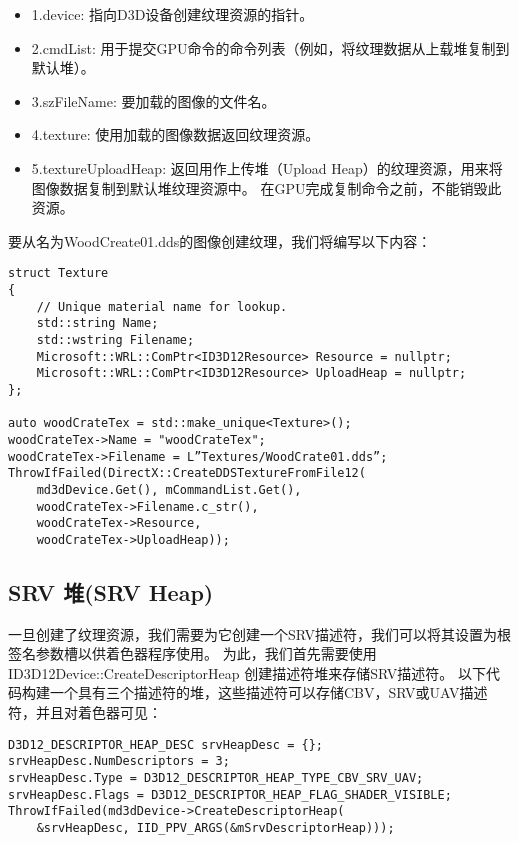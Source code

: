 \begin{itemize}
  \item 1.device: 指向D3D设备创建纹理资源的指针。
  \item 2.cmdList: 用于提交GPU命令的命令列表（例如，将纹理数据从上载堆复制到默认堆）。
  \item 3.szFileName: 要加载的图像的文件名。
  \item 4.texture: 使用加载的图像数据返回纹理资源。
  \item 5.textureUploadHeap: 返回用作上传堆（Upload Heap）的纹理资源，用来将图像数据复制到默认堆纹理资源中。 在GPU完成复制命令之前，不能销毁此资源。
\end{itemize}

\begin{flushleft}
要从名为WoodCreate01.dds的图像创建纹理，我们将编写以下内容：\\
\end{flushleft}

\begin{lstlisting}
struct Texture
{
    // Unique material name for lookup.
    std::string Name;
    std::wstring Filename;
    Microsoft::WRL::ComPtr<ID3D12Resource> Resource = nullptr;
    Microsoft::WRL::ComPtr<ID3D12Resource> UploadHeap = nullptr;
};

auto woodCrateTex = std::make_unique<Texture>();
woodCrateTex->Name = "woodCrateTex";
woodCrateTex->Filename = L”Textures/WoodCrate01.dds”;
ThrowIfFailed(DirectX::CreateDDSTextureFromFile12(
    md3dDevice.Get(), mCommandList.Get(),
    woodCrateTex->Filename.c_str(),
    woodCrateTex->Resource, 
    woodCrateTex->UploadHeap));
\end{lstlisting}

\subsection{SRV 堆(SRV Heap)}
\begin{flushleft}
一旦创建了纹理资源，我们需要为它创建一个SRV描述符，我们可以将其设置为根签名参数槽以供着色器程序使用。 为此，我们首先需要使用 ID3D12Device::CreateDescriptorHeap 创建描述符堆来存储SRV描述符。 以下代码构建一个具有三个描述符的堆，这些描述符可以存储CBV，SRV或UAV描述符，并且对着色器可见：\\
\end{flushleft}

\begin{lstlisting}
D3D12_DESCRIPTOR_HEAP_DESC srvHeapDesc = {};
srvHeapDesc.NumDescriptors = 3;
srvHeapDesc.Type = D3D12_DESCRIPTOR_HEAP_TYPE_CBV_SRV_UAV;
srvHeapDesc.Flags = D3D12_DESCRIPTOR_HEAP_FLAG_SHADER_VISIBLE;
ThrowIfFailed(md3dDevice->CreateDescriptorHeap(
    &srvHeapDesc, IID_PPV_ARGS(&mSrvDescriptorHeap)));
\end{lstlisting}

